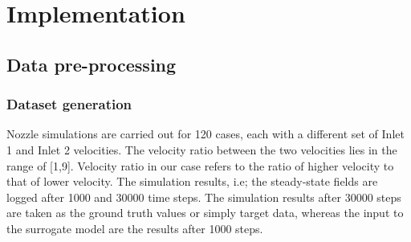 \chapter{Implementation}
\label{chap:Method}
\section{Data pre-processing}
\subsection{Dataset generation}
Nozzle simulations are carried out for 120 cases, each with a different set of Inlet 1 and Inlet 2 velocities. The velocity ratio between the two velocities lies in the range of [1,9]. Velocity ratio in our case refers to the ratio of higher velocity to that of lower velocity.
The simulation results, i.e; the steady-state fields are logged after 1000 and 30000 time steps. The simulation results after 30000 steps are taken as the ground truth values or simply target data, whereas the input to the surrogate model are the results after 1000 steps. 
